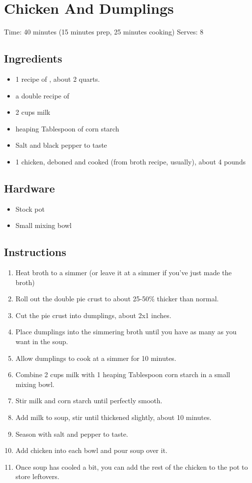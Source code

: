 \section{Chicken And Dumplings}
\label{chickenAndDumplings}
\setcounter{secnumdepth}{0}
Time: 40 minutes (15 minutes prep, 25 minutes cooking)
Serves: 8

\begin{multicols}{2}
\subsection*{Ingredients}
\begin{itemize}
    \item 1 recipe of , about 2 quarts.
    \item a double recipe of 
    \item 2 cups milk
    \item heaping Tablespoon of corn starch
    \item Salt and black pepper to taste
    \item 1 chicken, deboned and cooked (from broth recipe, usually), about 4 pounds
\end{itemize}

\subsection*{Hardware}
\begin{itemize}
    \item Stock pot
    \item Small mixing bowl
\end{itemize}
\clearpage

\subsection*{Instructions}
\begin{enumerate}
    \item Heat broth to a simmer (or leave it at a simmer if you've just made the broth)
    \item Roll out the double pie crust to about 25-50\% thicker than normal.
    \item Cut the pie crust into dumplings, about 2x1 inches.
    \item Place dumplings into the simmering broth until you have as many as you want in the soup.
    \item Allow dumplings to cook at a simmer for 10 minutes.
    \item Combine 2 cups milk with 1 heaping Tablespoon corn starch in a small mixing bowl.
    \item Stir milk and corn starch until perfectly smooth.
    \item Add milk to soup, stir until thickened slightly, about 10 minutes.
    \item Season with salt and pepper to taste.
    \item Add chicken into each bowl and pour soup over it.
    \item Once soup has cooled a bit, you can add the rest of the chicken to the pot to store leftovers.
\end{enumerate}


\end{multicols}
